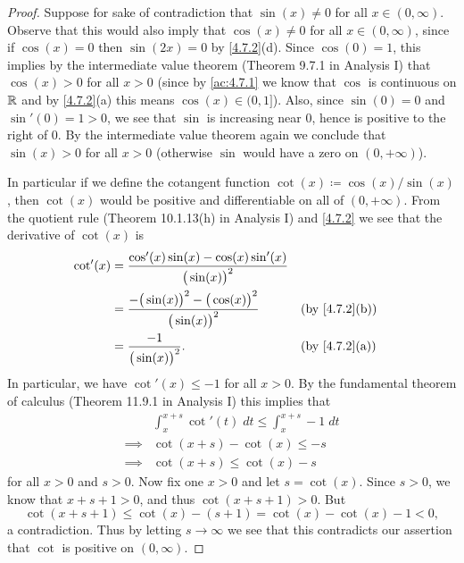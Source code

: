 \begin{proof}
  Suppose for sake of contradiction that \(\sin(x) \neq 0\) for all \(x \in (0, \infty)\).
  Observe that this would also imply that \(\cos(x) \neq 0\) for all \(x \in (0, \infty)\), since if \(\cos(x) = 0\) then \(\sin(2x) = 0\) by \cref{4.7.2}(d).
  Since \(\cos(0) = 1\), this implies by the intermediate value theorem (Theorem 9.7.1 in Analysis I) that \(\cos(x) > 0\) for all \(x > 0\)
  (since by \cref{ac:4.7.1} we know that \(\cos\) is continuous on \(\mathbb{R}\) and by \cref{4.7.2}(a) this means \(\cos(x) \in (0, 1]\)).
  Also, since \(\sin(0) = 0\) and \(\sin'(0) = 1 > 0\), we see that \(\sin\) is increasing near \(0\), hence is positive to the right of \(0\).
  By the intermediate value theorem again we conclude that \(\sin(x) > 0\) for all \(x > 0\)
  (otherwise \(\sin\) would have a zero on \((0, +\infty)\)).

  In particular if we define the cotangent function \(\cot(x) \coloneqq \cos(x) / \sin(x)\), then \(\cot(x)\) would be positive and differentiable on all of \((0, +\infty)\).
  From the quotient rule (Theorem 10.1.13(h) in Analysis I) and \cref{4.7.2} we see that the derivative of \(\cot(x)\) is
  \begin{align*}
    \cot'(x) & = \dfrac{\cos'(x) \sin(x) - \cos(x) \sin'(x)}{\big(\sin(x)\big)^2}                                         \\
             & = \dfrac{-\big(\sin(x)\big)^2 - \big(\cos(x)\big)^2}{\big(\sin(x)\big)^2} &  & \text{(by \cref{4.7.2}(b))} \\
             & = \dfrac{-1}{\big(\sin(x)\big)^2}.                                        &  & \text{(by \cref{4.7.2}(a))}
  \end{align*}
  In particular, we have \(\cot'(x) \leq -1\) for all \(x > 0\).
  By the fundamental theorem of calculus (Theorem 11.9.1 in Analysis I) this implies that
  \begin{align*}
             & \int_x^{x + s} \cot'(t) \; dt \leq \int_x^{x + s} -1 \; dt \\
    \implies & \cot(x + s) - \cot(x) \leq -s                              \\
    \implies & \cot(x + s) \leq \cot(x) - s
  \end{align*}
  for all \(x > 0\) and \(s > 0\).
  Now fix one \(x > 0\) and let \(s = \cot(x)\).
  Since \(s > 0\), we know that \(x + s + 1 > 0\), and thus \(\cot(x + s + 1) > 0\).
  But
  \[
    \cot(x + s + 1) \leq \cot(x) - (s + 1) = \cot(x) - \cot(x) - 1 < 0,
  \]
  a contradiction.
  Thus by letting \(s \to \infty\) we see that this contradicts our assertion that \(\cot\) is positive on \((0, \infty)\).
\end{proof}

